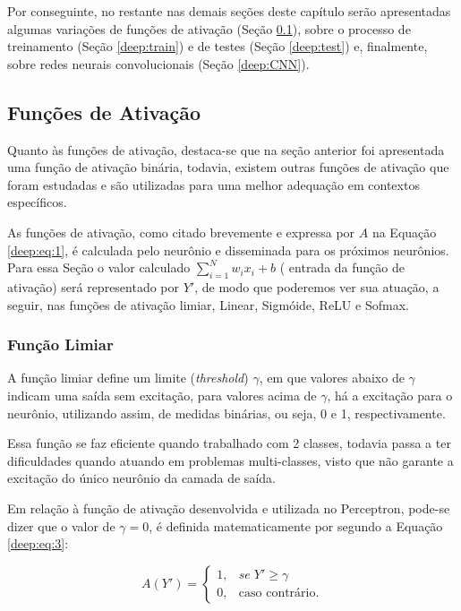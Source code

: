 Por conseguinte, no restante nas demais seções  deste capítulo serão apresentadas algumas variações de funções de ativação (Seção \ref{deep:activation}), sobre o processo de treinamento (Seção \ref{deep:train}) e de testes (Seção \ref{deep:test}) e, finalmente, sobre redes neurais convolucionais (Seção \ref{deep:CNN}).


\subsection{Funções de Ativação}
\label{deep:activation}

Quanto às funções de ativação, destaca-se que na seção anterior foi apresentada uma função de ativação binária, todavia, existem outras funções de ativação que foram estudadas e são utilizadas para uma melhor adequação em contextos específicos.

As funções de ativação, como citado brevemente e expressa por $A$ na Equação \ref{deep:eq:1}, é calculada pelo neurônio e disseminada para os próximos neurônios.  Para essa Seção o valor calculado $\sum_{i = 1}^{N} w_ix_i +b$ ( entrada da função de ativação) será representado por $Y'$, de modo que poderemos ver sua atuação, a seguir, nas funções de ativação limiar, Linear, Sigmóide, ReLU e Sofmax.


\subsubsection{Função Limiar}
A função limiar define um limite (\textit{threshold}) $\gamma$, em que valores abaixo de $\gamma$ indicam uma saída sem excitação, para valores acima de $\gamma$, há a excitação para o neurônio, utilizando assim, de medidas binárias, ou seja, 0 e 1, respectivamente.

Essa função se faz eficiente quando trabalhado com 2 classes, todavia passa a ter dificuldades quando atuando em problemas multi-classes, visto que não garante a excitação do único neurônio da camada de saída.

Em relação à função de ativação desenvolvida e utilizada no Perceptron, pode-se dizer que o valor de $\gamma = 0$, é definida matematicamente por \cite{mcculloch1943logical} segundo a Equação \ref{deep:eq:3}:

\begin{equation}
    \label{deep:eq:3}
    A(Y') = \left\{\begin{matrix}
     1,& se \; Y' \geq \gamma \\ 
     0,& \text{caso contrário}.
    \end{matrix}\right.
\end{equation}


